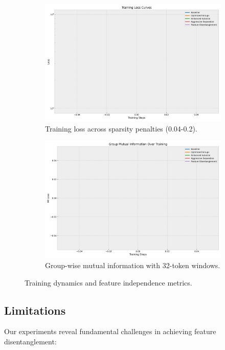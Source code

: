\documentclass{article} %
\begin{document}
\begin{figure}[h]
    \centering
    \begin{subfigure}{0.49\textwidth}
        \includegraphics[width=\textwidth]{training_curves.png}
        \caption{Training loss across sparsity penalties (0.04-0.2).}
        \label{fig:training_curves}
    \end{subfigure}
    \hfill
    \begin{subfigure}{0.49\textwidth}
        \includegraphics[width=\textwidth]{group_mi.png}
        \caption{Group-wise mutual information with 32-token windows.}
        \label{fig:group_mi}
    \end{subfigure}
    \caption{Training dynamics and feature independence metrics.}
    \label{fig:dynamics}
\end{figure}

\subsection{Limitations}
Our experiments reveal fundamental challenges in achieving feature disentanglement:
\end{document}
